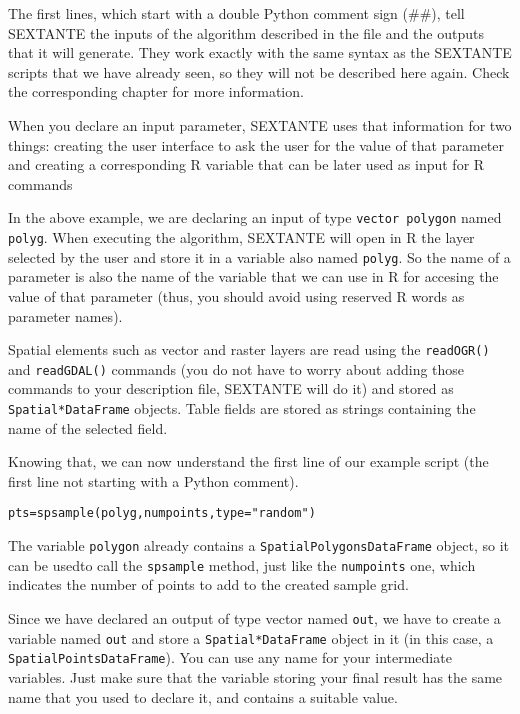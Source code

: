 The first lines, which start with a double Python comment sign (\#\#), tell SEXTANTE the inputs of the algorithm described in the file and the outputs that it will generate. They work exactly with the same syntax as the SEXTANTE scripts that we have already seen, so they will not be described here again. Check the corresponding chapter for more information.

When you declare an input parameter, SEXTANTE uses that information for two things: creating the user interface to ask the user for the value of that parameter and creating a corresponding R variable that can be later used as input for R commands

In the above example, we are declaring an input of type \texttt{vector polygon} named \texttt{polyg}. When executing the algorithm, SEXTANTE will open in R the layer selected by the user and store it in a variable also named \texttt{polyg}. So the name of a parameter is also the name of the variable that we can use in R for accesing the value of that parameter (thus, you should avoid using reserved R words as parameter names).

Spatial elements such as vector and raster layers are read using the \texttt{readOGR()} and \texttt{readGDAL()} commands (you do not have to worry about adding those commands to your description file, SEXTANTE will do it) and stored as \texttt{Spatial*DataFrame} objects. Table fields are stored as strings containing the name of the selected field.

Knowing that, we can now understand the first line of our example script (the first line not starting with a Python comment).


\begin{verbatim}
pts=spsample(polyg,numpoints,type="random")
\end{verbatim}

The variable \texttt{polygon} already contains a \texttt{SpatialPolygonsDataFrame} object, so it can be usedto call the \texttt{spsample} method, just like the \texttt{numpoints} one, which indicates the number of points to add to the created sample grid.

Since we have declared an output of type vector named \texttt{out}, we have to create a variable named \texttt{out} and store a \texttt{Spatial*DataFrame} object in it (in this case, a \texttt{SpatialPointsDataFrame}). You can use any name for your intermediate variables. Just make sure that the variable storing your final result has the same name that you used to declare it, and contains a suitable value.

